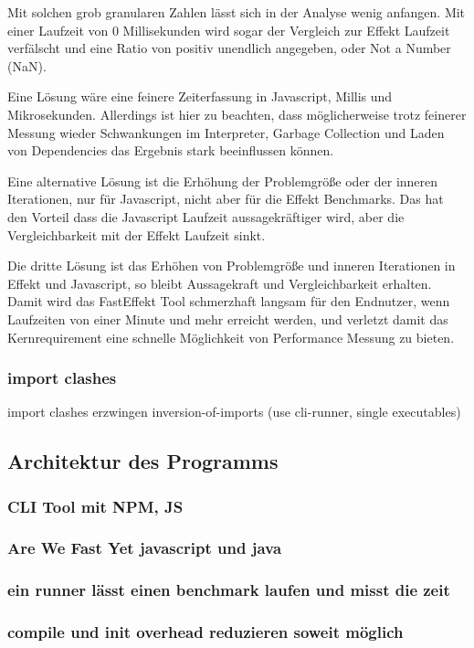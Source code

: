 Mit solchen grob granularen Zahlen lässt sich in der Analyse wenig anfangen. Mit einer Laufzeit von 0 Millisekunden wird sogar der Vergleich zur Effekt Laufzeit verfälscht und eine Ratio von positiv unendlich angegeben, oder Not a Number (NaN).

Eine Lösung wäre eine feinere Zeiterfassung in Javascript, Millis und Mikrosekunden. Allerdings ist hier zu beachten, dass möglicherweise trotz feinerer Messung wieder Schwankungen im Interpreter, Garbage Collection und Laden von Dependencies das Ergebnis stark beeinflussen können.

Eine alternative Lösung ist die Erhöhung der Problemgröße oder der inneren Iterationen, nur für Javascript, nicht aber für die Effekt Benchmarks.
Das hat den Vorteil dass die Javascript Laufzeit aussagekräftiger wird, aber die Vergleichbarkeit mit der Effekt Laufzeit sinkt.

Die dritte Lösung ist das Erhöhen von Problemgröße und inneren Iterationen in Effekt und Javascript, so bleibt Aussagekraft und Vergleichbarkeit erhalten.
Damit wird das FastEffekt Tool schmerzhaft langsam für den Endnutzer, wenn Laufzeiten von einer Minute und mehr erreicht werden, und verletzt damit das Kernrequirement eine schnelle Möglichkeit von Performance Messung zu bieten.

\subsubsection{ import clashes }
import clashes erzwingen inversion-of-imports (use cli-runner, single executables)

\subsection{Architektur des Programms}
\subsubsection{ CLI Tool mit NPM, JS }
\subsubsection{ Are We Fast Yet javascript und java }
\subsubsection{ ein runner lässt einen benchmark laufen und misst die zeit }
\subsubsection{ compile und init overhead reduzieren soweit möglich }
  
